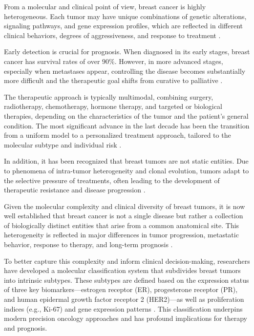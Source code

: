 From a molecular and clinical point of view, breast cancer is highly heterogeneous. Each tumor may have unique 
combinations of genetic alterations, signaling pathways, and gene expression profiles, which are reflected in different 
clinical behaviors, degrees of aggressiveness, and response to treatment \textcite{origins_and_evolution_bca_Polyak2007,diff_bca_usa_Howlader2018}.

Early detection is crucial for prognosis. When diagnosed in its early stages, breast cancer has survival rates of over 
$90\%$. However, in more advanced stages, especially when metastases appear, controlling the disease becomes substantially 
more difficult and the therapeutic goal shifts from curative to palliative \textcite{updatedbca_Hong2022Breast,clinical_implication_bca_Adamo2015}.

The therapeutic approach is typically multimodal, combining surgery, radiotherapy, chemotherapy, hormone therapy, and 
targeted or biological therapies, depending on the characteristics of the tumor and the patient's general condition. 
The most significant advance in the last decade has been the transition from a uniform model to a personalized treatment 
approach, tailored to the molecular subtype and individual risk \textcite{BreastEpidemiology_Romanowicz2022}.

In addition, it has been recognized that breast tumors are not static entities. Due to phenomena of intra-tumor heterogeneity 
and clonal evolution, tumors adapt to the selective pressure of treatments, often leading to the development of therapeutic 
resistance and disease progression \textcite{origins_and_evolution_bca_Polyak2007}.

Given the molecular complexity and clinical diversity of breast tumors, it is now well established that breast cancer is not a single disease but rather a collection of biologically distinct entities that arise from a common anatomical site. This heterogeneity is reflected in major differences in tumor progression, metastatic behavior, response to therapy, and long-term prognosis \textcite{clinical_implication_bca_Adamo2015,bc_subtypes_Prat2015Clinical}.

To better capture this complexity and inform clinical decision-making, researchers have developed a molecular classification system that subdivides breast tumors into intrinsic subtypes. These subtypes are defined based on the expression status of three key biomarkers—estrogen receptor (ER), progesterone receptor (PR), and human epidermal growth factor receptor 2 (HER2)—as well as proliferation indices (e.g., Ki-67) and gene expression patterns \textcite{Perou2000,bc_subtypes_Prat2015Clinical}. This classification underpins modern precision oncology approaches and has profound implications for therapy and prognosis.

